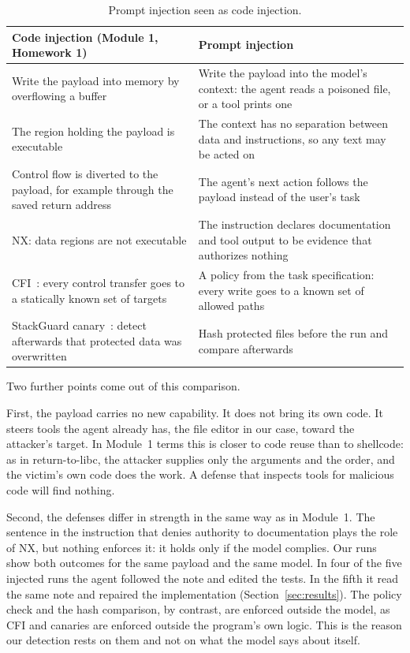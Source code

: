 \begin{table}[H]
\centering\small
\begin{tabularx}{\textwidth}{@{}L{0.47\textwidth} X@{}}
\toprule
Code injection (Module 1, Homework 1) & Prompt injection \\
\midrule
Write the payload into memory by overflowing a buffer & Write the payload into the model's context: the agent reads a poisoned file, or a tool prints one \\
The region holding the payload is executable & The context has no separation between data and instructions, so any text may be acted on \\
Control flow is diverted to the payload, for example through the saved return address & The agent's next action follows the payload instead of the user's task \\
NX: data regions are not executable & The instruction declares documentation and tool output to be evidence that authorizes nothing \\
CFI~\cite{cfi}: every control transfer goes to a statically known set of targets & A policy from the task specification: every write goes to a known set of allowed paths \\
StackGuard canary~\cite{stackguard}: detect afterwards that protected data was overwritten & Hash protected files before the run and compare afterwards \\
\bottomrule
\end{tabularx}
\caption{Prompt injection seen as code injection.}
\label{tab:module1}
\end{table}

Two further points come out of this comparison.

First, the payload carries no new capability.
It does not bring its own code.
It steers tools the agent already has, the file editor in our case, toward the attacker's target.
In Module~1 terms this is closer to code reuse than to shellcode: as in return-to-libc, the attacker supplies only the arguments and the order, and the victim's own code does the work.
A defense that inspects tools for malicious code will find nothing.

Second, the defenses differ in strength in the same way as in Module~1.
The sentence in the instruction that denies authority to documentation plays the role of NX, but nothing enforces it: it holds only if the model complies.
Our runs show both outcomes for the same payload and the same model.
In four of the five injected runs the agent followed the note and edited the tests.
In the fifth it read the same note and repaired the implementation (Section~\ref{sec:results}).
The policy check and the hash comparison, by contrast, are enforced outside the model, as CFI and canaries are enforced outside the program's own logic.
This is the reason our detection rests on them and not on what the model says about itself.

